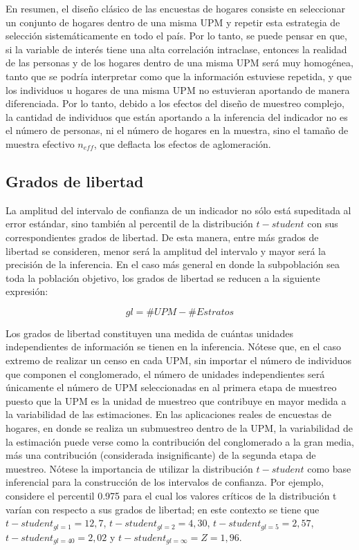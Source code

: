 \documentclass[
  12pt,
  spanish,
]{book}
\begin{document}
En resumen, el diseño clásico de las encuestas de hogares consiste en seleccionar un conjunto de hogares dentro de una misma UPM y repetir esta estrategia de selección sistemáticamente en todo el país. Por lo tanto, se puede pensar en que, si la variable de interés tiene una alta correlación intraclase, entonces la realidad de las personas y de los hogares dentro de una misma UPM será muy homogénea, tanto que se podría interpretar como que la información estuviese repetida, y que los individuos u hogares de una misma UPM no estuvieran aportando de manera diferenciada. Por lo tanto, debido a los efectos del diseño de muestreo complejo, la cantidad de individuos que están aportando a la inferencia del indicador no es el número de personas, ni el número de hogares en la muestra, sino el tamaño de muestra efectivo \(n_{eff}\), que deflacta los efectos de aglomeración.

\hypertarget{grados-de-libertad}{%
\subsection{Grados de libertad}\label{grados-de-libertad}}

La amplitud del intervalo de confianza de un indicador no sólo está supeditada al error estándar, sino también al percentil de la distribución \(t-student\) con sus correspondientes grados de libertad. De esta manera, entre más grados de libertad se consideren, menor será la amplitud del intervalo y mayor será la precisión de la inferencia. En el caso más general en donde la subpoblación sea toda la población objetivo, los grados de libertad se reducen a la siguiente expresión:

\[
gl = \# UPM - \# Estratos
\]

Los grados de libertad constituyen una medida de cuántas unidades independientes de información se tienen en la inferencia. Nótese que, en el caso extremo de realizar un censo en cada UPM, sin importar el número de individuos que componen el conglomerado, el número de unidades independientes será únicamente el número de UPM seleccionadas en al primera etapa de muestreo puesto que la UPM es la unidad de muestreo que contribuye en mayor medida a la variabilidad de las estimaciones. En las aplicaciones reales de encuestas de hogares, en donde se realiza un submuestreo dentro de la UPM, la variabilidad de la estimación puede verse como la contribución del conglomerado a la gran media, más una contribución (considerada insignificante) de la segunda etapa de muestreo. Nótese la importancia de utilizar la distribución \(t-student\) como base inferencial para la construcción de los intervalos de confianza. Por ejemplo, considere el percentil 0.975 para el cual los valores críticos de la distribución t varían con respecto a sus grados de libertad; en este contexto se tiene que \(t-student_{gl = 1} = 12,7\), \(t-student_{gl = 2} = 4,30\), \(t-student_{gl = 5} = 2,57\), \(t-student_{gl = 40} = 2,02\) y \(t-student_{gl = \infty} = Z = 1,96\).
\end{document}
